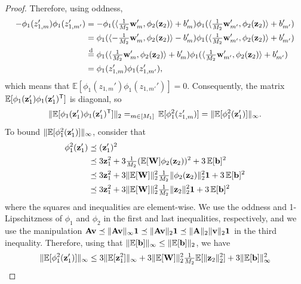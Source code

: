 \documentclass[twoside]{article}
\newcommand{\vb}{\mathbf{b}}
\newcommand{\vv}{\mathbf{v}}
\newcommand{\vw}{\mathbf{w}}
\newcommand{\vz}{\mathbf{z}}
\newcommand{\vone}{\mathbf{1}}
\newcommand{\mA}{\mathbf{A}}
\newcommand{\mW}{\mathbf{W}}
\newcommand{\E}{\mathbb{E}}
\newcommand{\T}{\text{\textsf{T}}}
\newcommand{\disteq}{\overset{\text{d}}{=}}
\newcommand{\opspace}{}
\let\max\relax\DeclareMathOperator*{\max}{max\opspace}
\DeclarePairedDelimiter\lra{\langle}{\rangle}    %
\DeclarePairedDelimiter\norm{\|}{\|}             %
\theoremstyle{theoremstyle}
\begin{document}
\begin{proof}
    Therefore, using oddness,
    \begin{align}
        -\phi_1(z_{1,m}') \phi_1(z_{1,m'}')
        &=
            -\phi_1(\lra{\tfrac1{M_2}\vw_m', \phi_2(\vz_2)} + b_m') 
            \phi_1(\lra{\tfrac1{M_2}\vw_{m'}', \phi_2(\vz_2)} + b_{m'}') \\
        &=
            \phi_1(\lra{-\tfrac1{M_2}\vw_m', \phi_2(\vz_2)} - b_m') 
            \phi_1(\lra{\tfrac1{M_2}\vw_{m'}', \phi_2(\vz_2)} + b_{m'}') \\
        &\disteq
            \phi_1(\lra{\tfrac1{M_2}\vw_m', \phi_2(\vz_2)} + b_m') 
            \phi_1(\lra{\tfrac1{M_2}\vw_{m'}', \phi_2(\vz_2)} + b_{m'}') \\
        &=\phi_1(z_{1,m}') \phi_1(z_{1,m'}'),
    \end{align}
    which means that $\E[\phi_1(z_{1,m}') \phi_1(z_{1,m'}')] = 0$. Consequently, the matrix $\E[\phi_1(\vz_1') \phi_1(\vz_1')^\T]$ is diagonal, so
    \begin{equation}
        \norm{\E[\phi_1(\vz'_1) \phi_1(\vz'_1)^\T]}_2
        = \max_{m \in [M_1]}\, \E[\phi_1^2(z'_{1,m})]
        = \norm{\E[\phi_1^2(\vz'_{1})]}_\infty.
    \end{equation}
    To bound $\norm{\E[\phi_1^2(\vz'_{1})]}_\infty$, consider that
    \begin{align}
        \phi_1^2(\vz'_{1})
        &\preceq (\vz'_{1})^2 \\
        &\preceq 3 \vz^2_{1} + 3 \tfrac1{M_2}(\E[\mW] \phi_2(\vz_{2}))^2 + 3\,\E[\vb]^2 \\
        &\preceq 3 \vz^2_{1} + 3 \norm{\E[\mW]}_2^2 \tfrac1{M_2}\norm{\phi_2(\vz_{2})}_2^2 \vone + 3\,\E[\vb]^2 \\
        &\preceq 3 \vz^2_{1} + 3 \norm{\E[\mW]}_2^2 \tfrac1{M_2}\norm{\vz_{2}}_2^2 \vone + 3\,\E[\vb]^2
    \end{align}
    where the squares and inequalities are element-wise. We use the oddness and 1-Lipschitzness of $\phi_1$ and $\phi_2$ in the first and last inequalities, respectively, and we use the manipulation $\mA\vv \preceq \norm{\mA\vv}_\infty \vone \preceq \norm{\mA\vv}_2 \vone \preceq \norm{\mA}_2\norm{\vv}_2 \vone$ in the third inequality. Therefore, using that $\norm{\E[\vb]}_\infty \le \norm{\E[\vb]}_2$, we have
    \begin{align}
        \norm{\E[\phi_1^2(\vz'_{1})]}_\infty
        &\le
            3 \norm{\E[\vz_1^2]}_\infty
            + 3 \norm{\E[\mW]}_2^2 \tfrac1{M_2}\E[\norm{\vz_{2}}_2^2]
            + 3 \norm{\E[\vb]}_\infty^2 \\

\end{align}
\end{proof}
\end{document}
